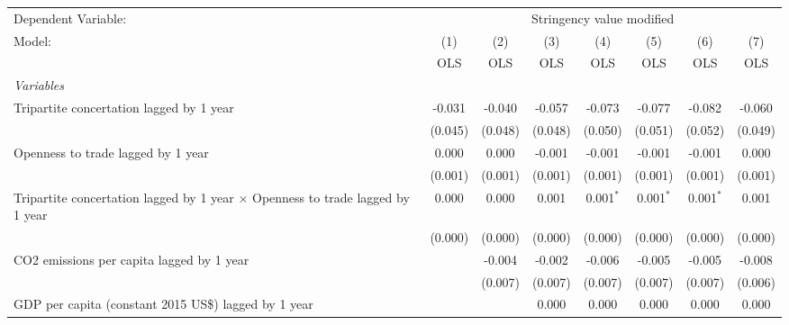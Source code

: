 
\begingroup
\centering
\begin{tabular}{lccccccc}
   \toprule
   Dependent Variable: & \multicolumn{7}{c}{Stringency value modified}\\
   Model:                                                                                & (1)     & (2)     & (3)     & (4)         & (5)         & (6)         & (7)\\  
                                                                                         &  OLS    & OLS     & OLS     & OLS         & OLS         & OLS         & OLS\\  
   \midrule
   \emph{Variables}\\
   Tripartite concertation lagged by 1 year                                              & -0.031  & -0.040  & -0.057  & -0.073      & -0.077      & -0.082      & -0.060\\   
                                                                                         & (0.045) & (0.048) & (0.048) & (0.050)     & (0.051)     & (0.052)     & (0.049)\\   
   Openness to trade lagged by 1 year                                                    & 0.000   & 0.000   & -0.001  & -0.001      & -0.001      & -0.001      & 0.000\\   
                                                                                         & (0.001) & (0.001) & (0.001) & (0.001)     & (0.001)     & (0.001)     & (0.001)\\   
   Tripartite concertation lagged by 1 year $\times$ Openness to trade lagged by 1 year  & 0.000   & 0.000   & 0.001   & 0.001$^{*}$ & 0.001$^{*}$ & 0.001$^{*}$ & 0.001\\   
                                                                                         & (0.000) & (0.000) & (0.000) & (0.000)     & (0.000)     & (0.000)     & (0.000)\\   
   CO2 emissions per capita lagged by 1 year                                             &         & -0.004  & -0.002  & -0.006      & -0.005      & -0.005      & -0.008\\   
                                                                                         &         & (0.007) & (0.007) & (0.007)     & (0.007)     & (0.007)     & (0.006)\\   
   GDP per capita (constant 2015 US\$) lagged by 1 year                                  &         &         & 0.000   & 0.000       & 0.000       & 0.000       & 0.000\\   

\end{tabular}
